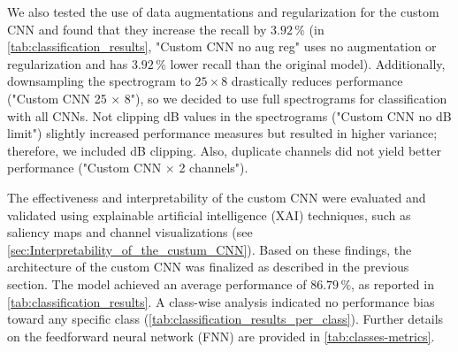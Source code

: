 \documentclass[preprint,NumberedRefs]{JASA}
\begin{document}
We also tested the use of data augmentations and regularization for the custom CNN and found that they increase the recall by \(3.92\,\mathrm{\%}\) (in \ref{tab:classification_results}, "Custom CNN no aug reg" uses no augmentation or regularization and has \(3.92\,\mathrm{\%}\) lower recall than the original model). Additionally, downsampling the spectrogram to \(25 \times 8\) drastically reduces performance ("Custom CNN 25 $\times$ 8"), so we decided to use full spectrograms for classification with all CNNs. Not clipping dB values in the spectrograms ("Custom CNN no dB limit") slightly increased performance measures but resulted in higher variance; therefore, we included dB clipping. Also, duplicate channels did not yield better performance ("Custom CNN $\times$ 2 channels").

The effectiveness and interpretability of the custom CNN were evaluated and validated using explainable artificial intelligence (XAI) techniques, such as saliency maps and channel visualizations (see \autoref{sec:Interpretability_of_the_custum_CNN}). Based on these findings, the architecture of the custom CNN was finalized as described in the previous section. The model achieved an average performance of \(86.79\,\%\), as reported in \autoref{tab:classification_results}. A class-wise analysis indicated no performance bias toward any specific class (\autoref{tab:classification_results_per_class}). Further details on the feedforward neural network (FNN) are provided in \autoref{tab:classes-metrics}.
\end{document}

